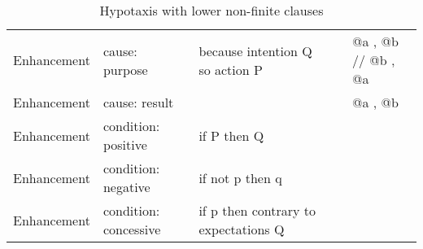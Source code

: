 \begin{landscape}
\begin{table}[]
{\begin{tabulary}{3\textwidth}{p{7em}p{10em}p{10em}p{18em}p{18em}}
        Enhancement & cause: purpose & because intention Q so action P &  & @a , @b // @b , @a \\
        Enhancement & cause: result &  &  & @a , @b \\
        Enhancement & condition: positive & if P then Q &  &  \\
        Enhancement & condition: negative & if not p then q &  &  \\
        Enhancement & condition: concessive & if p then contrary to expectations Q &  &  \\ \bottomrule
        \end{tabulary}%
    }
    \caption{Hypotaxis with lower non-finite clauses}
    \label{tab:hypotaxis-non-finite}
    \end{table}
    \end{landscape}
    
    \newpage
    
